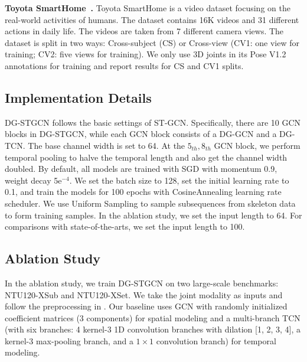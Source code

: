 \noindent
\textbf{Toyota SmartHome~\cite{Das_2019_ICCV}. }
Toyota SmartHome is a video dataset focusing on the real-world activities of humans.
The dataset contains 16K videos and 31 different actions in daily life. 
The videos are taken from 7 different camera views.
The dataset is split in two ways: Cross-subject (CS) or Cross-view (CV1: one view for training; CV2: five views for training). 
We only use 3D joints in its Pose V1.2 annotations for training and report results for CS and CV1 splits.

\subsection{Implementation Details} 
DG-STGCN follows the basic settings of ST-GCN. 
Specifically, there are 10 GCN blocks in DG-STGCN, while each GCN block consists of a DG-GCN and a DG-TCN. 
The base channel width is set to 64. 
At the $5_{th}, 8_{th}$ GCN block, we perform temporal pooling to halve the temporal length and also get the channel width doubled.
By default, all models are trained with SGD with momentum 0.9, weight decay 5e$^{-4}$. 
We set the batch size to 128, set the initial learning rate to 0.1, and train the models for 100 epochs with CosineAnnealing learning rate scheduler. 
We use Uniform Sampling to sample subsequences from skeleton data to form training samples.
In the ablation study, we set the input length to 64. 
For comparisons with state-of-the-arts, we set the input length to 100.

\vspace{-3mm}
\subsection{Ablation Study} 

In the ablation study, we train DG-STGCN on two large-scale benchmarks: NTU120-XSub and NTU120-XSet.
We take the joint modality as inputs and follow the preprocessing in \cite{chen2021channel}. 
Our baseline uses GCN with randomly initialized coefficient matrices (3 components) for spatial modeling and a multi-branch TCN (with six branches: 4 kernel-3 1D convolution branches with dilation [1, 2, 3, 4], a kernel-3 max-pooling branch, and a $1\times 1$ convolution branch) for temporal modeling.


